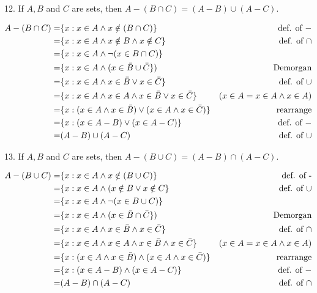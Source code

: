 \documentclass{idrisMemo}
\begin{document}
\begin{prooflist}{12. If $A, B$ and $C$ are sets, then $A-(B \cap C)=(A-B) \cup(A-C)$.}
\item
\begin{align*}
    A-(B \cap C)=& \{x: x\in A \land x\notin(B \cap C)\} & \text{def. of }-\\
    =& \{x: x\in A \land x\notin B \land x\notin C\} & \text{def. of $\cap$}\\
    =& \{x: x\in A \land \neg{(x\in B \cap C})\} & \\
    =& \{x: x\in A \land (x\in \bar{B} \cup \bar{C}\}) & \text{Demorgan}\\
    =& \{x: x\in A \land x\in \bar{B} \lor x\in\bar{C}\} & \text{def. of }\cup\\
    =& \{x: x\in A \land x\in A \land x\in \bar{B} \lor x\in\bar{C}\} & (x\in A = x\in A \land x \in A) \\
    =& \{x: (x\in A \land x\in \bar{B}) \lor (x\in A \land x\in\bar{C})\} & \text{rearrange}\\
    =& \{x: (x\in A  - B) \lor (x\in A - C)\} & \text{def. of }-\\
    =& (A - B) \cup (A-C) & \text{def. of }\cup\\
\end{align*}
\end{prooflist}


\begin{prooflist}{13. If $A, B$ and $C$ are sets, then $A-(B \cup C)=(A-B) \cap(A-C)$.}
\item
\begin{align*}
    A-(B \cup C)=& \{x: x\in A \land x\notin(B \cup C)\} & \text{def. of -}\\
    =& \{x: x\in A \land (x\notin B \lor x\notin C\} & \text{def. of $\cup$}\\
    =& \{x: x\in A \land \neg{(x\in B \cup C})\} & \\
    =& \{x: x\in A \land (x\in \bar{B} \cap \bar{C}\}) & \text{Demorgan}\\
    =& \{x: x\in A \land x\in \bar{B} \land x\in\bar{C}\} & \text{def. of }\cap\\
    =& \{x: x\in A \land x\in A \land x\in \bar{B} \land x\in\bar{C}\} & (x\in A = x\in A \land x \in A) \\
    =& \{x: (x\in A \land x\in \bar{B}) \land (x\in A \land x\in\bar{C})\} & \text{rearrange}\\
    =& \{x: (x\in A  - B) \land (x\in A - C)\} & \text{def. of }-\\
    =& (A - B) \cap (A-C) & \text{def. of }\cap
\end{align*}
\end{prooflist}
\end{document}

